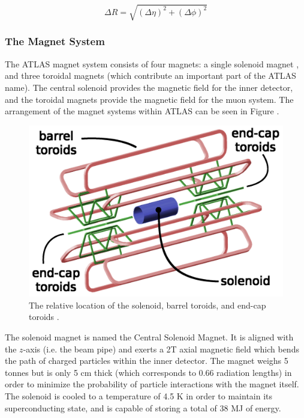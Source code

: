 \documentclass[12pt,a4paper,epsf,portrait,times,epsfig]{article}
\begin{document}
		\begin{equation}
			\Delta R = \sqrt{ (\Delta\eta)^{2} + (\Delta\phi)^{2} }
		\end{equation}


		\subsubsection{The Magnet System}\label{Section:Magnets}

		The ATLAS magnet system consists of four magnets: a single solenoid magnet \cite{ATLASSolenoidMagnet}, and three toroidal magnets \cite{ATLASBarrelToroid, ATLASEndcapToroid} (which contribute an important part of the ATLAS name). The central solenoid provides the magnetic field for the inner detector, and the toroidal magnets provide the magnetic field	for the muon system. The arrangement of the magnet systems within ATLAS can be seen in Figure . \par

		\begin{figure}
			\centering
			\includegraphics[scale=0.15]{Magnet_Layout.png}
			\caption{The relative location of the solenoid, barrel toroids, and end-cap toroids \cite{ATLASToroids}. }
			\label{Fig:CernMagneticLayout}
		\end{figure}

		The solenoid magnet is named the Central Solenoid Magnet. It is aligned with the $z$-axis (i.e. the beam pipe) and exerts a 2T axial magnetic field which bends the path of charged particles within the inner detector. The magnet weighs 5 tonnes but is only 5 cm thick (which corresponds to 0.66 radiation lengths) in order to minimize the probability of particle interactions with the magnet itself. The solenoid is cooled to a temperature of 4.5 K in order to maintain its superconducting state, and is capable of storing a total of 38 MJ of energy. \par
		
\end{document}
